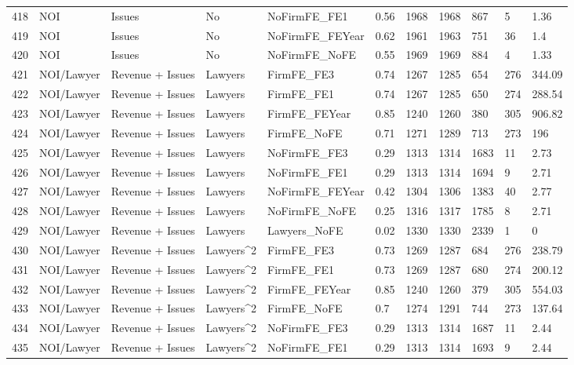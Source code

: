 \begin{table}[ht]
\begin{tabular}{rllllllllll}
  418 & NOI & Issues & No & NoFirmFE\_FE1 & 0.56 & 1968 & 1968 & 867 & 5 & 1.36 \\ 
  419 & NOI & Issues & No & NoFirmFE\_FEYear & 0.62 & 1961 & 1963 & 751 & 36 & 1.4 \\ 
  420 & NOI & Issues & No & NoFirmFE\_NoFE & 0.55 & 1969 & 1969 & 884 & 4 & 1.33 \\ 
  421 & NOI/Lawyer & Revenue + Issues & Lawyers & FirmFE\_FE3 & 0.74 & 1267 & 1285 & 654 & 276 & 344.09 \\ 
  422 & NOI/Lawyer & Revenue + Issues & Lawyers & FirmFE\_FE1 & 0.74 & 1267 & 1285 & 650 & 274 & 288.54 \\ 
  423 & NOI/Lawyer & Revenue + Issues & Lawyers & FirmFE\_FEYear & 0.85 & 1240 & 1260 & 380 & 305 & 906.82 \\ 
  424 & NOI/Lawyer & Revenue + Issues & Lawyers & FirmFE\_NoFE & 0.71 & 1271 & 1289 & 713 & 273 & 196 \\ 
  425 & NOI/Lawyer & Revenue + Issues & Lawyers & NoFirmFE\_FE3 & 0.29 & 1313 & 1314 & 1683 & 11 & 2.73 \\ 
  426 & NOI/Lawyer & Revenue + Issues & Lawyers & NoFirmFE\_FE1 & 0.29 & 1313 & 1314 & 1694 & 9 & 2.71 \\ 
  427 & NOI/Lawyer & Revenue + Issues & Lawyers & NoFirmFE\_FEYear & 0.42 & 1304 & 1306 & 1383 & 40 & 2.77 \\ 
  428 & NOI/Lawyer & Revenue + Issues & Lawyers & NoFirmFE\_NoFE & 0.25 & 1316 & 1317 & 1785 & 8 & 2.71 \\ 
  429 & NOI/Lawyer & Revenue + Issues & Lawyers & Lawyers\_NoFE & 0.02 & 1330 & 1330 & 2339 & 1 & 0 \\ 
  430 & NOI/Lawyer & Revenue + Issues & Lawyers^2 & FirmFE\_FE3 & 0.73 & 1269 & 1287 & 684 & 276 & 238.79 \\ 
  431 & NOI/Lawyer & Revenue + Issues & Lawyers^2 & FirmFE\_FE1 & 0.73 & 1269 & 1287 & 680 & 274 & 200.12 \\ 
  432 & NOI/Lawyer & Revenue + Issues & Lawyers^2 & FirmFE\_FEYear & 0.85 & 1240 & 1260 & 379 & 305 & 554.03 \\ 
  433 & NOI/Lawyer & Revenue + Issues & Lawyers^2 & FirmFE\_NoFE & 0.7 & 1274 & 1291 & 744 & 273 & 137.64 \\ 
  434 & NOI/Lawyer & Revenue + Issues & Lawyers^2 & NoFirmFE\_FE3 & 0.29 & 1313 & 1314 & 1687 & 11 & 2.44 \\ 
  435 & NOI/Lawyer & Revenue + Issues & Lawyers^2 & NoFirmFE\_FE1 & 0.29 & 1313 & 1314 & 1693 & 9 & 2.44 \\ 

\end{tabular}
\end{table}
